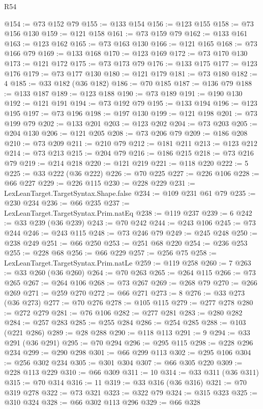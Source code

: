 \begin{lexlean}{R54}
\begin{coremodule}
@154 := @73 @152 @79
@155 := @133 @154
@156 := @123 @155
@158 := @73 @156 @130
@159 := @121 @158
@161 := @73 @159 @79
@162 := @133 @161
@163 := @123 @162
@165 := @73 @163 @130
@166 := @121 @165
@168 := @73 @166 @79
@169 := @133 @168
@170 := @123 @169
@172 := @73 @170 @130
@173 := @121 @172
@175 := @73 @173 @79
@176 := @133 @175
@177 := @123 @176
@179 := @73 @177 @130
@180 := @121 @179
@181 := @73 @180
@182 := 4
@185 := @33 @182 (@36 @182)
@186 := @70 @185
@187 := @136 @79
@188 := @133 @187
@189 := @123 @188
@190 := @73 @189
@191 := @190 @130
@192 := @121 @191
@194 := @73 @192 @79
@195 := @133 @194
@196 := @123 @195
@197 := @73 @196
@198 := @197 @130
@199 := @121 @198
@201 := @73 @199 @79
@202 := @133 @201
@203 := @123 @202
@204 := @73 @203
@205 := @204 @130
@206 := @121 @205
@208 := @73 @206 @79
@209 := @186 @208
@210 := @73 @209
@211 := @210 @79
@212 := @181 @211
@213 := @123 @212
@214 := @73 @213
@215 := @204 @79
@216 := @186 @215
@218 := @73 @216 @79
@219 := @214 @218
@220 := @121 @219
@221 := @118 @220
@222 := 5
@225 := @33 @222 (@36 @222)
@226 := @70 @225
@227 := @226 @106
@228 := @66 @227
@229 := @226 @115
@230 := @228 @229
@231 := LexLeanTarget.TargetSyntax.Shape.false
@234 := @109 @231 @61 @79
@235 := @230 @234
@236 := @66 @235
@237 := LexLeanTarget.TargetSyntax.Prim.natEq
@238 := @119 @237
@239 := 6
@242 := @33 @239 (@36 @239)
@243 := @70 @242
@244 := @243 @106
@245 := @73 @244
@246 := @243 @115
@248 := @73 @246 @79
@249 := @245 @248
@250 := @238 @249
@251 := @66 @250
@253 := @251 @68 @220
@254 := @236 @253
@255 := @228 @68
@256 := @66 @229
@257 := @256 @75
@258 := LexLeanTarget.TargetSyntax.Prim.natLe
@259 := @119 @258
@260 := 7
@263 := @33 @260 (@36 @260)
@264 := @70 @263
@265 := @264 @115
@266 := @73 @265
@267 := @264 @106
@268 := @73 @267
@269 := @268 @79
@270 := @266 @269
@271 := @259 @270
@272 := @66 @271
@273 := 8
@276 := @33 @273 (@36 @273)
@277 := @70 @276
@278 := @105 @115
@279 := @277 @278
@280 := @272 @279
@281 := @76 @106
@282 := @277 @281
@283 := @280 @282
@284 := @257 @283
@285 := @255 @284
@286 := @254 @285
@288 := @103 (@221 @286)
@289 := @28 @288
@290 := @118 @113
@291 := 9
@294 := @33 @291 (@36 @291)
@295 := @70 @294
@296 := @295 @115
@298 := @228 @296 @234
@299 := @290 @298
@301 := @66 @299 @113
@302 := @295 @106
@304 := @256 @302 @234
@305 := @301 @304
@307 := @66 @305 @220
@309 := @228 @113 @229
@310 := @66 @309
@311 := 10
@314 := @33 @311 (@36 @311)
@315 := @70 @314
@316 := 11
@319 := @33 @316 (@36 @316)
@321 := @70 @319 @278
@322 := @73 @321
@323 := @322 @79
@324 := @315 @323
@325 := @310 @324
@328 := @66 @302 @113 @296
@329 := @66 @328

\end{coremodule}
\end{lexlean}
